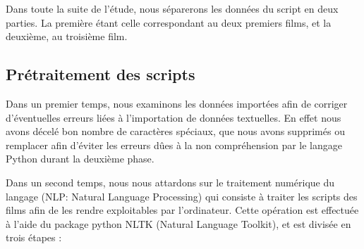 \documentclass[11pt]{article}
\begin{document}
Dans toute la suite de l'étude, nous séparerons les données du script en deux parties. La première étant celle correspondant au deux premiers films, et la deuxième, au troisième film.

\subsection{Prétraitement des scripts}

Dans un premier temps, nous examinons les données importées afin de corriger d’éventuelles erreurs liées à l'importation de données textuelles. En effet nous avons décelé bon nombre de caractères spéciaux, que nous avons supprimés ou remplacer afin d'éviter les erreurs dûes à la non compréhension par le langage Python durant la deuxième phase.\par

Dans un second temps, nous nous attardons sur le traitement numérique du langage (NLP: Natural Language Processing) qui consiste à traiter les scripts des films afin de les rendre exploitables par l'ordinateur. Cette opération est effectuée à l'aide du package python NLTK (Natural Language Toolkit), et est divisée en trois étapes :
\end{document}
